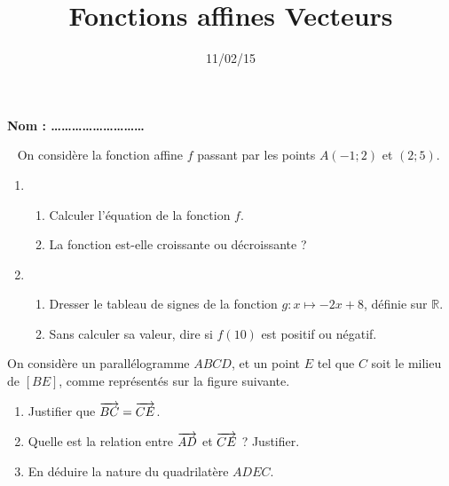 \documentclass[12pt]{article}
\title{\large Fonctions affines Vecteurs}
\date{11/02/15}
\begin{document}
\textbf{\Large Nom : \ldots\ldots\ldots\ldots\ldots\ldots\ldots\ldots\ldots}
\vspace{.5cm}

\maketitle

\begin{exercice}~
  On considère la fonction affine $f$ passant par les points $A\left( -1;2 \right)$ et $\left( 2;5 \right)$.
  \begin{enumerate}
    \item 
      \begin{enumerate}
        \item Calculer l'équation de la fonction $f$.
        \item La fonction est-elle croissante ou décroissante ?
      \end{enumerate}
    \item 
      \begin{enumerate}
        \item Dresser le tableau de signes de la fonction $g:x\mapsto -2x+8$, définie sur $\mathbb{R}$.
        \item Sans calculer sa valeur, dire si $f(10)$ est positif ou négatif.
      \end{enumerate}
  \end{enumerate}
\end{exercice}

\begin{exercice}
  On considère un parallélogramme $ABCD$, et un point $E$ tel que $C$ soit le
  milieu de $\left[ BE \right]$, comme représentés sur la figure suivante.

  \begin{center}
  \end{center}
  \begin{enumerate}
    \item Justifier que $\overrightarrow{BC}=\overrightarrow{CE}$.
    \item Quelle est la relation entre $\overrightarrow{AD}$ et $\overrightarrow{CE}$ ? Justifier.
    \item En déduire la nature du quadrilatère $ADEC$.
  \end{enumerate}
\end{exercice}
\end{document}
